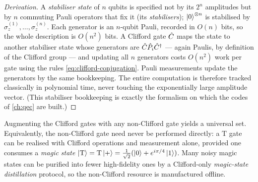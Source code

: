 \begin{proof}[Derivation]
A \emph{stabiliser state} of $n$ qubits is specified not by its $2^n$
amplitudes but by $n$ commuting Pauli operators that fix it (its
\emph{stabilisers}); $\ket{0}^{\otimes n}$ is stabilised by
$\hat\sigma_z^{(1)},\dots,\hat\sigma_z^{(n)}$. Each generator is an
$n$-qubit Pauli, recorded in $O(n)$ bits, so the whole description is
$O(n^2)$ bits. A Clifford gate $\hat{C}$ maps the state to another
stabiliser state whose generators are $\hat{C}\hat P_i\hat{C}^\dagger$ ---
again Paulis, by definition of the Clifford group --- and updating all
$n$ generators costs $O(n^2)$ work per gate using the rules
\cref{eq:clifford-conjugation}. Pauli measurements update the generators
by the same bookkeeping. The entire computation is therefore tracked
classically in polynomial time, never touching the exponentially large
amplitude vector. (This stabiliser bookkeeping is exactly the formalism
on which the codes of \cref{ch:qec} are built.)
\end{proof}

\begin{statement}
\label{stmt:magic-distillation}
Augmenting the Clifford gates with any non-Clifford gate yields a
universal set. Equivalently, the non-Clifford gate need never be
performed directly: a $\mathrm{T}$ gate can be realised with Clifford
operations and measurement alone, provided one consumes a \emph{magic
state} $\ket{\mathrm{T}}=\mathrm{T}\ket{+}
=\tfrac{1}{\sqrt2}(\ket{0}+e^{i\pi/4}\ket{1})$. Many noisy magic states
can be purified into fewer high-fidelity ones by a Clifford-only
\emph{magic-state distillation} protocol, so the non-Clifford resource
is manufactured offline.
\end{statement}


